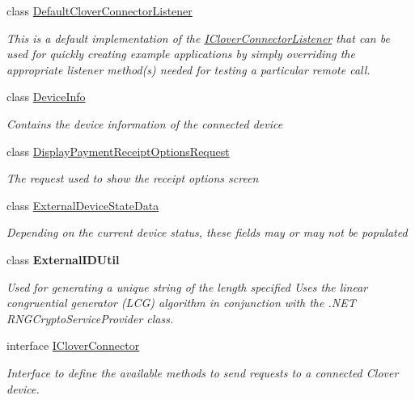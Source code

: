 \begin{DoxyCompactItemize}
class \hyperlink{classcom_1_1clover_1_1remotepay_1_1sdk_1_1_default_clover_connector_listener}{Default\+Clover\+Connector\+Listener}
\begin{DoxyCompactList}\small\item\em This is a default implementation of the \hyperlink{interfacecom_1_1clover_1_1remotepay_1_1sdk_1_1_i_clover_connector_listener}{I\+Clover\+Connector\+Listener} that can be used for quickly creating example applications by simply overriding the appropriate listener method(s) needed for testing a particular remote call. \end{DoxyCompactList}\item 
class \hyperlink{classcom_1_1clover_1_1remotepay_1_1sdk_1_1_device_info}{Device\+Info}
\begin{DoxyCompactList}\small\item\em Contains the device information of the connected device \end{DoxyCompactList}\item 
class \hyperlink{classcom_1_1clover_1_1remotepay_1_1sdk_1_1_display_payment_receipt_options_request}{Display\+Payment\+Receipt\+Options\+Request}
\begin{DoxyCompactList}\small\item\em The request used to show the receipt options screen \end{DoxyCompactList}\item 
class \hyperlink{classcom_1_1clover_1_1remotepay_1_1sdk_1_1_external_device_state_data}{External\+Device\+State\+Data}
\begin{DoxyCompactList}\small\item\em Depending on the current device status, these fields may or may not be populated \end{DoxyCompactList}\item 
class {\bfseries External\+I\+D\+Util}
\begin{DoxyCompactList}\small\item\em Used for generating a unique string of the length specified Uses the linear congruential generator (L\+CG) algorithm in conjunction with the .N\+ET R\+N\+G\+Crypto\+Service\+Provider class. \end{DoxyCompactList}\item 
interface \hyperlink{interfacecom_1_1clover_1_1remotepay_1_1sdk_1_1_i_clover_connector}{I\+Clover\+Connector}
\begin{DoxyCompactList}\small\item\em Interface to define the available methods to send requests to a connected Clover device. \end{DoxyCompactList}\item 

\end{DoxyCompactItemize}
